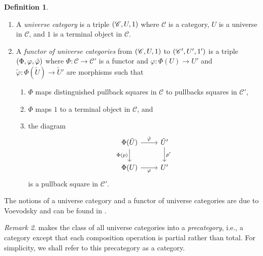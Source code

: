 \documentclass[10pt,letterpaper,cm]{nupset}
\theoremstyle{definition}
\newtheorem{definition}{Definition}[subsection]
\theoremstyle{theorem}
\theoremstyle{remark}
\newtheorem{remark}[definition]{Remark}
\newcommand{\0}{\mathbf{0}}
\newcommand{\1}{\mathbf{1}}
\newcommand{\2}{\mathbf{2}}
\renewcommand{\c}{\mathscr{C}}
\newcommand{\be}{\begin{enumerate}}
\newcommand{\ee}{\end{enumerate}}
\begin{document}
\begin{definition}\label{ucat} $  $
\be
\item A \textit{universe category} is a triple $\mleft(\c, U, 1\mright)$ where $\c$ is a category, $U$ is a universe in $\c$, and $1$ is a terminal object in $\c$. 
\item A \textit{functor of universe categories} from $\mleft(\c, U, 1\mright)$ to $\mleft(\c', U', 1'\mright)$ is a triple $\mleft(\Phi, \varphi, \tilde{\varphi}\mright)$ where $\Phi : \c \to \c'$ is a functor and $\varphi: \Phi(U) \to U'$ and $ \tilde{\varphi}: \Phi(\tilde{U}) \to \tilde{U}'$ are morphisms such that
\be
\item $\Phi$ maps distinguished pullback squares in $\c$ to pullbacks squares in $\c'$,
\item $\Phi$ maps $1$ to a terminal object in $\c$, and
\item the diagram
\[
\begin{tikzcd}
\Phi(\tilde{U}) \arrow[d, "\Phi(p)"'] \arrow[r, "\tilde{\varphi}"] & \tilde{U}' \arrow[d, "p'"] \\
\Phi(U) \arrow[r, "\varphi"']                                      & U'                        
\end{tikzcd}
\]
is a pullback square in $\c'$.
\ee
\ee
\end{definition}

The notions of a universe category and a functor of universe categories are due to Voevodsky and can be found in \cite{voev}.

\begin{remark}
 makes the class of all universe categories into a \textit{precategory}, i.e., a category except that each composition operation is partial rather than total. For simplicity, we shall refer to this precategory as a category.
\end{remark}

\pagebreak
\end{document}
